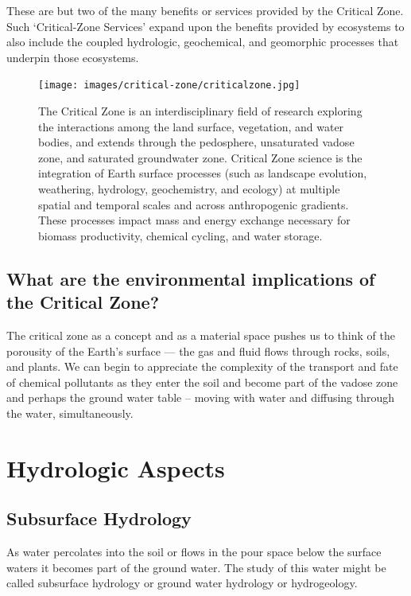 \documentclass{book}\usepackage{knitr}
\begin{document}
These are but two of the many benefits or services provided by the Critical Zone. Such `Critical-Zone Services' expand upon the benefits provided by ecosystems to also include the coupled hydrologic, geochemical, and geomorphic processes that underpin those ecosystems.

\begin{figure}
\texttt{[image: images/critical-zone/criticalzone.jpg]}
\caption{The Critical Zone is an interdisciplinary field of research exploring the interactions among the land surface, vegetation, and water bodies, and extends through the pedosphere, unsaturated vadose zone, and saturated groundwater zone. Critical Zone science is the integration of Earth surface processes (such as landscape evolution, weathering, hydrology, geochemistry, and ecology) at multiple spatial and temporal scales and across anthropogenic gradients. These processes impact mass and energy exchange necessary for biomass productivity, chemical cycling, and water storage.}
\label{fig:criticalzone}
\end{figure}

\subsection{What are the environmental implications of the Critical Zone?}

The critical zone as a concept and as a material space pushes us to think of the porousity of the Earth's surface --- the gas and fluid flows through rocks, soils, and plants. We can begin to appreciate the complexity of the transport and fate of chemical pollutants as they enter the soil and become part of the vadose zone and perhaps the ground water table -- moving with water and diffusing through the water, simultaneously.

\section{Hydrologic Aspects}

\subsection{Subsurface Hydrology}

As water percolates into the soil or flows in the pour space below the surface waters it becomes part of the ground water. The study of this water might be called subsurface hydrology or ground water hydrology or hydrogeology. 
\end{document}
